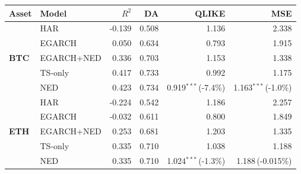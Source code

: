 \begin{tabular}{llrrrr}
\toprule
Asset & Model & $R^2$ & DA & QLIKE & MSE \\
\midrule
\multirow{5}{*}{\textbf{BTC}} & HAR & -0.139 & 0.508 & 1.136 & 2.338 \\
 & EGARCH & 0.050 & 0.634 & 0.793 & 1.915 \\
 & EGARCH+NED & 0.336 & 0.703 & 1.153 & 1.338 \\
 & TS-only & 0.417 & 0.733 & 0.992 & 1.175 \\
 & NED & 0.423 & 0.734 & 0.919$^{***}$\,(-7.4\%) & 1.163$^{***}$\,(-1.0\%) \\
\midrule
\multirow{5}{*}{\textbf{ETH}} & HAR & -0.224 & 0.542 & 1.186 & 2.257 \\
 & EGARCH & -0.032 & 0.611 & 0.800 & 1.849 \\
 & EGARCH+NED & 0.253 & 0.681 & 1.203 & 1.335 \\
 & TS-only & 0.335 & 0.710 & 1.038 & 1.188 \\
 & NED & 0.335 & 0.710 & 1.024$^{***}$\,(-1.3\%) & 1.188\,(-0.015\%) \\
\bottomrule
\end{tabular}
